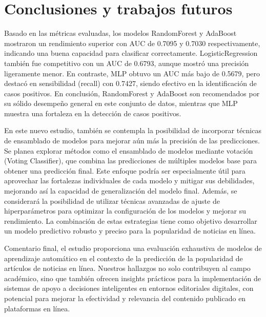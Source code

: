 \documentclass[
  number,
  preprint,
  3p,
  twocolumn]{elsarticle}
\begin{document}
\section{Conclusiones y trabajos
futuros}\label{conclusiones-y-trabajos-futuros}

Basado en las métricas evaluadas, los modelos RandomForest y AdaBoost
mostraron un rendimiento superior con AUC de 0.7095 y 0.7030
respectivamente, indicando una buena capacidad para clasificar
correctamente. LogisticRegression también fue competitivo con un AUC de
0.6793, aunque mostró una precisión ligeramente menor. En contraste, MLP
obtuvo un AUC más bajo de 0.5679, pero destacó en sensibilidad (recall)
con 0.7427, siendo efectivo en la identificación de casos positivos. En
conclusión, RandomForest y AdaBoost son recomendados por su sólido
desempeño general en este conjunto de datos, mientras que MLP muestra
una fortaleza en la detección de casos positivos.

En este nuevo estudio, también se contempla la posibilidad de incorporar
técnicas de ensamblado de modelos para mejorar aún más la precisión de
las predicciones. Se planea explorar métodos como el ensamblado de
modelos mediante votación (Voting Classifier), que combina las
predicciones de múltiples modelos base para obtener una predicción
final. Este enfoque podría ser especialmente útil para aprovechar las
fortalezas individuales de cada modelo y mitigar sus debilidades,
mejorando así la capacidad de generalización del modelo final. Además,
se considerará la posibilidad de utilizar técnicas avanzadas de ajuste
de hiperparámetros para optimizar la configuración de los modelos y
mejorar su rendimiento. La combinación de estas estrategias tiene como
objetivo desarrollar un modelo predictivo robusto y preciso para la
popularidad de noticias en línea.

Comentario final, el estudio proporciona una evaluación exhaustiva de
modelos de aprendizaje automático en el contexto de la predicción de la
popularidad de artículos de noticias en línea. Nuestros hallazgos no
solo contribuyen al campo académico, sino que también ofrecen insights
prácticos para la implementación de sistemas de apoyo a decisiones
inteligentes en entornos editoriales digitales, con potencial para
mejorar la efectividad y relevancia del contenido publicado en
plataformas en línea.
\end{document}
